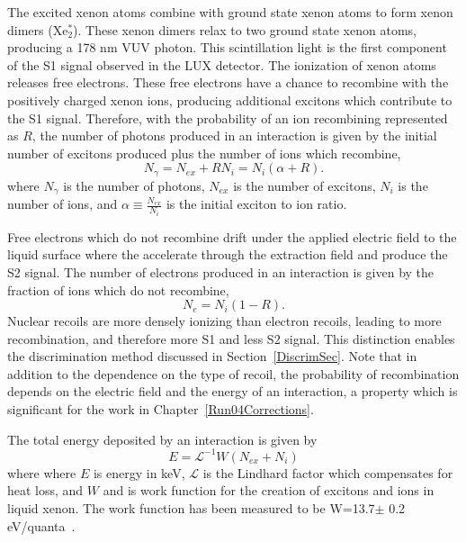 The excited xenon atoms combine with ground state xenon atoms to form xenon dimers (Xe$^*_2$).  These xenon dimers relax to two ground state xenon atoms, producing a 178 nm VUV photon.  This scintillation light is the first component of the S1 signal observed in the LUX detector. The ionization of xenon atoms releases free electrons.  These free electrons have a chance to recombine with the positively charged xenon ions, producing additional excitons which contribute to the S1 signal. Therefore, with the probability of an ion recombining represented as $R$, the number of photons produced in an interaction is given by the initial number of excitons produced plus the number of ions which recombine,
\begin{equation}
N_\gamma = N_{ex} + R N_i = N_{i}  (\alpha + R).
\end{equation}
where $N_\gamma$ is the number of photons, $N_{ex}$ is the number of excitons, $N_i$ is the number of ions, and $\alpha \equiv \frac{N_{ex}}{N_i}$ is the initial exciton to ion ratio. 



Free electrons which do not recombine drift under the applied electric field to the liquid surface where the accelerate through the extraction field and produce the S2 signal.  The number of electrons produced in an interaction is given by the fraction of ions which do not recombine,
\begin{equation}
N_e = N_i(1-R).
\end{equation}
Nuclear recoils are more densely ionizing than electron recoils, leading to more recombination, and therefore more S1 and less S2 signal.  This distinction enables the discrimination method discussed in Section~\ref{DiscrimSec}.  Note that in addition to the dependence on the type of recoil, the probability of recombination depends on the electric field and the energy of an interaction, a property which is significant for the work in Chapter~\ref{Run04Corrections}.

The total energy deposited by an interaction is given by
\begin{equation} \label{EnergyOne}
E = \mathcal{L}^{-1} W (N_{ex} + N_i)
\end{equation}
where where $E$ is energy in keV, $\mathcal{L}$ is the Lindhard factor which compensates for heat loss, and $W$ and is work function for the creation of excitons and ions in liquid xenon. The work function has been measured to be  W=13.7$\pm$ 0.2 eV/quanta~\cite{Dahl}. 

